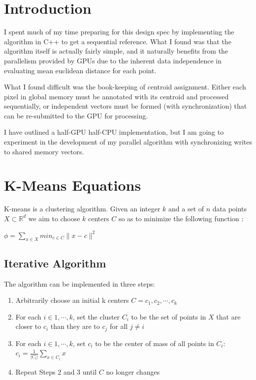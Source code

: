 \documentclass[11pt]{article}
\begin{document}
\maketitle

\section*{Introduction}
I spent much of my time preparing for this design spec by implementing the algorithm in
C++ to get a sequential reference. What I found was that the algorithm itself is actually
fairly simple, and it naturally benefits from the parallelism provided by GPUs due to
the inherent data independence in evaluating mean euclidean distance for each point.

What I found difficult was the book-keeping of centroid assignment. Either each pixel
in global memory must be annotated with its centroid and processed sequentially, or independent
vectors must be formed (with synchronization) that can be re-submitted to the GPU for processing.

I have outlined a half-GPU half-CPU implementation, but I am going to experiment
in the development of my parallel algorithm with synchronizing writes to shared memory vectors.

\section{K-Means Equations}

K-means is a clustering algorithm. Given an integer $k$ and a set of $n$ data points $X \subset \mathbb{R}^d$ we aim to choose $k$ centers $C$ so as to minimize the following function \cite{arthur}:
\newline

\begin{math}
\phi = \displaystyle\sum_{x \in X} min_{c \in C }\| x - c \|^2
\end{math}

\subsection{Iterative Algorithm}
The algorithm can be implemented in three steps:

\begin{enumerate}
\item Arbitrarily choose an initial k centers $C = {c_1, c_2, \cdots, c_k}$
\item For each $i \in {1, \cdots, k}$, set the cluster $C_i$ to be the set of points in $X$ that are closer to $c_i$ than they are to $c_j$ for all $j \neq i$
\item For each $i \in {1, \cdots, k}$, set $c_i$ to be the center of mass of all points in $C_i$: $c_i = \frac{1}{|C_i|}\sum_{x \in C_i}x$
\item Repeat Steps 2 and 3 until $C$ no longer changes
\end{enumerate}
\end{document}
